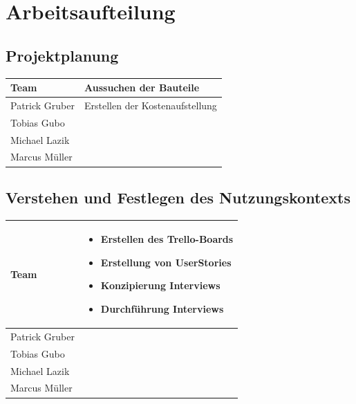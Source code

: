 \documentclass[12pt, a4paper]{scrartcl}
\begin{document}
	
	
	
	
	\section{Arbeitsaufteilung}
	\subsection*{Projektplanung}
	\begin{tabularx}{0.95\textwidth}{|l|X|}
		\hline
		Team & Aussuchen der Bauteile\\
		\hline
		Patrick Gruber & Erstellen der Kostenaufstellung\\
		\hline
		Tobias Gubo & \\
		\hline
		Michael Lazik & \\
		\hline
		Marcus Müller & \\
		\hline
	\end{tabularx}
	
	\subsection*{Verstehen und Festlegen des Nutzungskontexts}
	\begin{tabularx}{0.95\textwidth}{|l|X|}
		\hline
		Team & \begin{itemize}
			\setlength{\itemsep}{-0.5em}
			\item Erstellen des Trello-Boards
			\item Erstellung von UserStories
			\item Konzipierung Interviews
			\item Durchführung Interviews 
		\end{itemize}\\
		\hline
		Patrick Gruber & \\
		\hline
		Tobias Gubo & \\
		\hline
		Michael Lazik & \\
		\hline
		Marcus Müller & \\
		\hline
	\end{tabularx}
\end{document}
